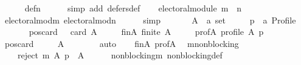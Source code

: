 \begin{isabellebody}
\ \ \ \ \isamarkupfalse%
\ def{\isacharunderscore}{\kern0pt}{}{\isacharunderscore}{\kern0pt}n\isanewline
\ \ \ \ \isamarkupfalse%
\ {\isacharparenleft}{\kern0pt}simp\ add{\isacharcolon}{\kern0pt}\ defers{\isacharunderscore}{\kern0pt}def{\isacharparenright}{\kern0pt}\isanewline
\ \ \isamarkupfalse%
\ {\isachardoublequoteopen}electoral{\isacharunderscore}{\kern0pt}module\ {\isacharparenleft}{\kern0pt}m\ {\isasymtriangleright}\ n{\isacharparenright}{\kern0pt}{\isachardoublequoteclose}\isanewline
\ \ \ \ \isamarkupfalse%
\ electoral{\isacharunderscore}{\kern0pt}mod{\isacharunderscore}{\kern0pt}m\ electoral{\isacharunderscore}{\kern0pt}mod{\isacharunderscore}{\kern0pt}n\isanewline
\ \ \ \ \isamarkupfalse%
\ simp\isanewline
{}\isamarkupfalse%
\isanewline
\ \ \isamarkupfalse%
\isanewline
\ \ \ \ A\ {\isacharcolon}{\kern0pt}{\isacharcolon}{\kern0pt}\ {\isachardoublequoteopen}{\isacharprime}{\kern0pt}a\ set{\isachardoublequoteclose}\ \isanewline
\ \ \ \ p\ {\isacharcolon}{\kern0pt}{\isacharcolon}{\kern0pt}\ {\isachardoublequoteopen}{\isacharprime}{\kern0pt}a\ Profile{\isachardoublequoteclose}\isanewline
\ \ \isamarkupfalse%
\isanewline
\ \ \ \ pos{\isacharunderscore}{\kern0pt}card{\isacharcolon}{\kern0pt}\ {\isachardoublequoteopen}{}\ {\isasymle}\ card\ A{\isachardoublequoteclose}\ \isanewline
\ \ \ \ fin{\isacharunderscore}{\kern0pt}A{\isacharcolon}{\kern0pt}\ {\isachardoublequoteopen}finite\ A{\isachardoublequoteclose}\ \isanewline
\ \ \ \ prof{\isacharunderscore}{\kern0pt}A{\isacharcolon}{\kern0pt}\ {\isachardoublequoteopen}profile\ A\ p{\isachardoublequoteclose}\isanewline
\ \ \isamarkupfalse%
\ pos{\isacharunderscore}{\kern0pt}card\ \isamarkupfalse%
\isanewline
\ \ \ \ {\isachardoublequoteopen}A\ {\isasymnoteq}\ {\isacharbraceleft}{\kern0pt}{\isacharbraceright}{\kern0pt}{\isachardoublequoteclose}\isanewline
\ \ \ \ \isamarkupfalse%
\ auto\isanewline
\ \ \isamarkupfalse%
\ fin{\isacharunderscore}{\kern0pt}A\ prof{\isacharunderscore}{\kern0pt}A\ \isamarkupfalse%
\ m{\isacharunderscore}{\kern0pt}non{\isacharunderscore}{\kern0pt}blocking{\isacharcolon}{\kern0pt}\isanewline
\ \ \ \ {\isachardoublequoteopen}reject\ m\ A\ p\ {\isasymnoteq}\ A{\isachardoublequoteclose}\isanewline
\ \ \ \ \isamarkupfalse%
\ non{\isacharunderscore}{\kern0pt}blocking{\isacharunderscore}{\kern0pt}m\ non{\isacharunderscore}{\kern0pt}blocking{\isacharunderscore}{\kern0pt}def\isanewline

\end{isabellebody}
